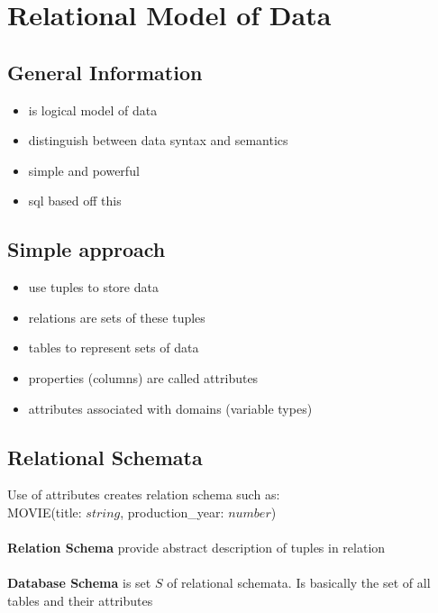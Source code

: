 \documentclass{article}
\begin{document}
\section{Relational Model of Data}
	\subsection{General Information}
		\begin{itemize}
			\item is logical model of data
			\item distinguish between data syntax and semantics
			\item simple and powerful
			\item sql based off this
		\end{itemize}

	\subsection{Simple approach}
		\begin{itemize}
			\item use tuples to store data
			\item relations are sets of these tuples
			\item tables to represent sets of data
			\item properties (columns) are called attributes
			\item attributes associated with domains (variable types)
		\end{itemize}

	\subsection{Relational Schemata}

		Use of attributes creates relation schema such as:
		\\ MOVIE(title: $string$, production\_year: $number$)
		\\ \\
		\textbf{Relation Schema} provide abstract description of tuples in relation
		\\ \\
		\textbf{Database Schema} is set $S$ of relational schemata. Is basically the set of all tables and their attributes
\end{document}
